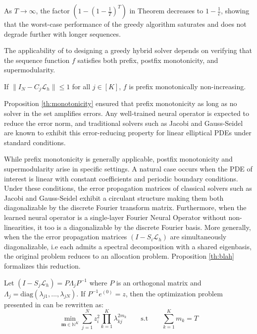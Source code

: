 \documentclass[12pt]{article}
\begin{document}
As $T \to \infty$, the factor $\left(1 - \left(1 - \frac{1}{T}\right)^T\right)$ in Theorem  decreases to $1 - \frac{1}{e}$, showing that the worst-case performance of the greedy algorithm saturates and does not degrade further with longer sequences.

The applicability of  to designing a greedy hybrid solver depends on verifying that the sequence function $f$ satisfies both prefix, postfix monotonicity, and supermodularity.

\begin{proposition} \label{th:monotonicity}
    If $\|I_N - C_j\mathcal{L}_h\| \leq 1$ for all $j \in [K]$, $f$ is prefix monotonically non-increasing.
\end{proposition}

Proposition \ref{th:monotonicity} ensured that prefix monotonicity as long as no solver in the set amplifies errors. Any well-trained neural operator is expected to reduce the error norm, and traditional solvers such as Jacobi and Gauss-Seidel are known to exhibit this error-reducing property for linear elliptical PDEs under standard conditions. 

While prefix monotonicity is generally applicable, postfix monotonicity and supermodularity arise in specific settings. A natural case occurs when the PDE of interest is linear with constant coefficients and periodic boundary conditions. Under these conditions, the error propagation matrices of classical solvers such as Jacobi and Gauss-Seidel exhibit a circulant structure making them both diagonalizable by the discrete Fourier transform matrix. Furthermore, when the learned neural operator is a single-layer Fourier Neural Operator without non-linearities, it too is a diagonalizable by the discrete Fourier basis. More generally, when the the error propagation matrices $\left(I - S_i \mathcal{L}_{h}\right)$ are simultaneously diagonalizable, i.e each admits a spectral decomposition with a shared eigenbasis, the original problem reduces to an allocation problem. Proposition \ref{th:blah} formalizes this reduction. 
\begin{proposition} \label{th:blah}
     Let $\left(I - S_j \mathcal{L}_{h}\right) = P\Lambda_jP^{-1}$ where $P$ is an orthogonal matrix and $\Lambda_j = \mathrm{diag}(\lambda_{j1}, \dots, \lambda_{jN})$. If $P^{-1}e^{(0)} = z$, then the optimization problem presented in  can be rewritten as:
     \begin{equation} \label{eq:simultaneous}
          \min_{\mathbf{m} \in \mathbb{N}^K} \sum_{j = 1}^N z_i^2 \prod_{k = 1}^K \lambda_{kj}^{2m_k} \qquad\mathrm{s.t}\qquad \sum_{k=1}^{K} m_k = T 
     \end{equation}
\end{proposition}
\end{document}

